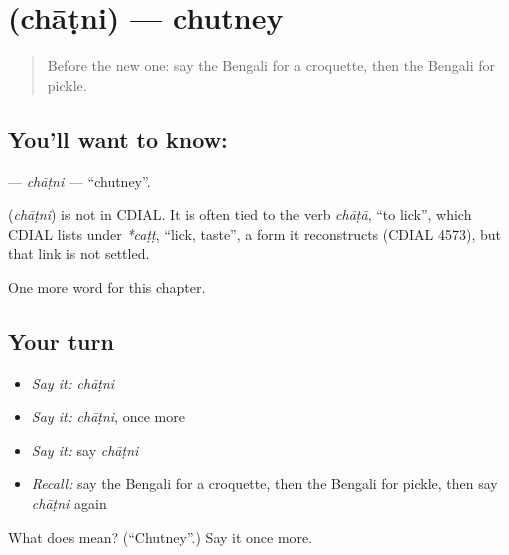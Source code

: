 \section[\texorpdfstring{\bn{চাটনি} (chāṭni)}{চাটনি (chāṭni)}]{ (chāṭni) — chutney}

\label{lesson:BN-C196-chatni}



\begin{quote}
Before the new one: say the Bengali for a croquette, then the Bengali for pickle.
\end{quote}

\subsection*{You'll want to know: }
\textbf{} — \emph{chāṭni} — \textquotedblleft{}chutney\textquotedblright{}.

\begin{cousinweb}
\textbf{} (\emph{chāṭni}) is not in CDIAL. It is often tied to the verb \emph{chāṭā}, \textquotedblleft{}to lick\textquotedblright{}, which CDIAL lists under \emph{*caṭṭ}, \textquotedblleft{}lick, taste\textquotedblright{}, a form it reconstructs (CDIAL 4573), but that link is not settled.
\end{cousinweb}

\begin{grammarlens}[title={What you've built}]
One more word for this chapter.
\end{grammarlens}

\subsection*{Your turn}
\begin{itemize}
\raggedright
  \item \emph{Say it:} \emph{chāṭni}
  \item \emph{Say it:} \emph{chāṭni}, once more
  \item \emph{Say it:} say \emph{chāṭni}
  \item \emph{Recall:} say the Bengali for a croquette, then the Bengali for pickle, then say \emph{chāṭni} again
\end{itemize}

\begin{tcolorbox}[breakable,colback=teal!4,colframe=teal!35!black,title={Before you move on}]
What does  mean? (\textquotedblleft{}Chutney\textquotedblright{}.) Say it once more.
\end{tcolorbox}
